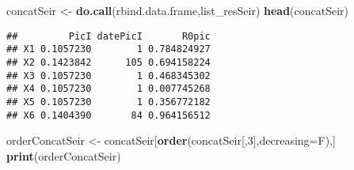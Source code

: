 \documentclass[
]{article}
\newenvironment{Shaded}{\begin{snugshade}}{\end{snugshade}}
\newcommand{\DataTypeTok}[1]{\textcolor[rgb]{0.13,0.29,0.53}{#1}}
\newcommand{\DecValTok}[1]{\textcolor[rgb]{0.00,0.00,0.81}{#1}}
\newcommand{\KeywordTok}[1]{\textcolor[rgb]{0.13,0.29,0.53}{\textbf{#1}}}
\newcommand{\NormalTok}[1]{#1}
\newcommand{\StringTok}[1]{\textcolor[rgb]{0.31,0.60,0.02}{#1}}
\begin{document}
\begin{Shaded}
\begin{Highlighting}[]
\NormalTok{concatSeir <-}\StringTok{ }\KeywordTok{do.call}\NormalTok{(rbind.data.frame,list_resSeir)}
\KeywordTok{head}\NormalTok{(concatSeir)}
\end{Highlighting}
\end{Shaded}

\begin{verbatim}
##         PicI datePicI       R0pic
## X1 0.1057230        1 0.784824927
## X2 0.1423842      105 0.694158224
## X3 0.1057230        1 0.468345302
## X4 0.1057230        1 0.007745268
## X5 0.1057230        1 0.356772182
## X6 0.1404390       84 0.964156512
\end{verbatim}

\begin{Shaded}
\begin{Highlighting}[]
\NormalTok{orderConcatSeir <-}\StringTok{ }\NormalTok{concatSeir[}\KeywordTok{order}\NormalTok{(concatSeir[,}\DecValTok{3}\NormalTok{],}\DataTypeTok{decreasing=}\NormalTok{F),]}
\KeywordTok{print}\NormalTok{(orderConcatSeir)}
\end{Highlighting}
\end{Shaded}
\end{document}
